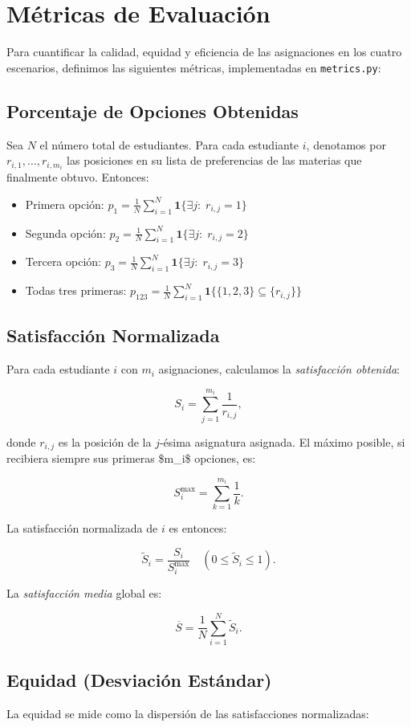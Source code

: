 \documentclass{article}
\begin{document}
\section{Métricas de Evaluación}
Para cuantificar la calidad, equidad y eficiencia de las asignaciones en los cuatro escenarios, definimos las siguientes métricas, implementadas en \texttt{metrics.py}:

\subsection{Porcentaje de Opciones Obtenidas}
Sea $N$ el número total de estudiantes. Para cada estudiante $i$, denotamos por ${r_{i,1},\dots,r_{i,m_i}}$ las posiciones en su lista de preferencias de las materias que finalmente obtuvo. Entonces:
\begin{itemize}
\item Primera opción:
\(p_1 = \frac{1}{N} \sum_{i=1}^N \mathbf{1}\{\exists j:\;r_{i,j}=1\}\)
\item Segunda opción:
\(p_2 = \frac{1}{N} \sum_{i=1}^N \mathbf{1}\{\exists j:\;r_{i,j}=2\}\)
\item Tercera opción:
\(p_3 = \frac{1}{N} \sum_{i=1}^N \mathbf{1}\{\exists j:\;r_{i,j}=3\}\)
\item Todas tres primeras:
\(p_{123} = \frac{1}{N} \sum_{i=1}^N \mathbf{1}\{\{1,2,3\} \subseteq \{r_{i,j}\}\}\)
\end{itemize}

\subsection{Satisfacción Normalizada}
Para cada estudiante $i$ con $m_i$ asignaciones, calculamos la\emph{ satisfacción obtenida}:

$$
S_i = \sum_{j=1}^{m_i} \frac{1}{r_{i,j}},
$$

donde $r_{i,j}$ es la posición de la $j$-ésima asignatura asignada. El máximo posible, si recibiera siempre sus primeras \$m\_i\$ opciones, es:

$$
S_i^{\max} = \sum_{k=1}^{m_i} \frac{1}{k}.
$$

La satisfacción normalizada de $i$ es entonces:

$$
\widetilde S_i = \frac{S_i}{S_i^{\max}} \quad (0\le\widetilde S_i\le1).
$$

La\emph{ satisfacción media} global es:

$$
\overline S = \frac{1}{N} \sum_{i=1}^N \widetilde S_i.
$$

\subsection{Equidad (Desviación Estándar)}
La equidad se mide como la dispersión de las satisfacciones normalizadas:
\end{document}
